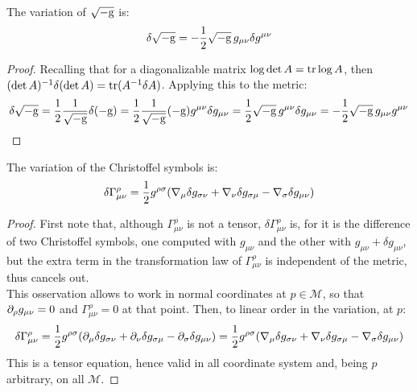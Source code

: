 \begin{lemma}\label{lemma-sqgm}
  The variation of $ \sqrt{-\mathrm{g}} $ is:
  \begin{equation}
    \delta \sqrt{-\mathrm{g}} = - \frac{1}{2} \sqrt{-\mathrm{g}}\, g_{\mu \nu} \delta g^{\mu \nu}
    \label{eq:4.2}
  \end{equation}
\end{lemma}
\begin{proof}
  Recalling that for a diagonalizable matrix $ \log \det A = \operatorname{tr} \log A $, then $ (\det A)^{-1} \delta (\det A) = \operatorname{tr} (A^{-1} \delta A) $. Applying this to the metric:
  \begin{equation*}
    \delta \sqrt{-\mathrm{g}} = \frac{1}{2} \frac{1}{\sqrt{-\mathrm{g}}} \delta (-\mathrm{g}) = \frac{1}{2} \frac{1}{\sqrt{-\mathrm{g}}} (-\mathrm{g}) g^{\mu \nu} \delta g_{\mu \nu} = \frac{1}{2} \sqrt{-\mathrm{g}}\, g^{\mu \nu} \delta g_{\mu \nu} = - \frac{1}{2} \sqrt{-\mathrm{g}}\, g_{\mu \nu} g^{\mu \nu}
  \end{equation*}
\end{proof}

\begin{lemma}
  The variation of the Christoffel symbols is:
  \begin{equation}
    \delta \Gamma^\rho_{\mu \nu} = \frac{1}{2} g^{\rho \sigma} ( \nabla_\mu \delta g_{\sigma \nu} + \nabla_\nu \delta g_{\sigma \mu} - \nabla_\sigma \delta g_{\mu \nu} )
    \label{eq:4.3}
  \end{equation}
\end{lemma}
\begin{proof}
  First note that, although $ \Gamma^\rho_{\mu \nu} $ is not a tensor, $ \delta \Gamma^\rho_{\mu \nu} $ is, for it is the difference of two Christoffel symbols, one computed with $ g_{\mu \nu} $ and the other with $ g_{\mu \nu} + \delta g_{\mu \nu} $, but the extra term in the transformation law of $ \Gamma^\rho_{\mu \nu} $ is independent of the metric, thus cancels out.\\
  This osservation allows to work in normal coordinates at $ p \in \mathcal{M} $, so that $ \partial_\rho g_{\mu \nu} = 0 $ and $ \Gamma^\rho_{\mu \nu} = 0 $ at that point. Then, to linear order in the variation, at $ p $:
  \begin{equation*}
    \delta \Gamma^\rho_{\mu \nu} = \frac{1}{2} g^{\rho \sigma} ( \partial_\mu \delta g_{\sigma \nu} + \partial_\nu \delta g_{\sigma \mu} - \partial_\sigma \delta g_{\mu \nu} ) = \frac{1}{2} g^{\rho \sigma} ( \nabla_\mu \delta g_{\sigma \nu} + \nabla_\nu \delta g_{\sigma \mu} - \nabla_\sigma \delta g_{\mu \nu} )
  \end{equation*}
  This is a tensor equation, hence valid in all coordinate system and, being $ p $ arbitrary, on all $ \mathcal{M} $.
\end{proof}

